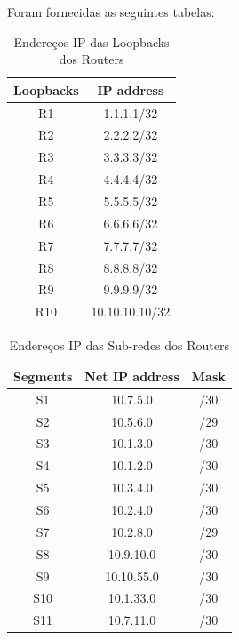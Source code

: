 \documentclass[11pt,english, openright, oneside]{book}
\begin{document}
\vspace{0.2cm}

Foram fornecidas as seguintes tabelas:

\begin{table}[H]
\centering
\begin{tabular}{|c|c|}
\hline
\textbf{Loopbacks} & \textbf{IP address} \\ \hline
R1 & 1.1.1.1/32 \\ \hline
R2 & 2.2.2.2/32 \\ \hline
R3 & 3.3.3.3/32 \\ \hline
R4 & 4.4.4.4/32 \\ \hline
R5 & 5.5.5.5/32 \\ \hline
R6 & 6.6.6.6/32 \\ \hline
R7 & 7.7.7.7/32 \\ \hline
R8 & 8.8.8.8/32 \\ \hline
R9 & 9.9.9.9/32 \\ \hline
R10 & 10.10.10.10/32 \\ \hline
\end{tabular}
\caption{Endereços IP das Loopbacks dos Routers}
\label{tab:loopbacks}
\end{table}
\vspace{0.2cm}

\begin{table}[H]
\centering
\begin{tabular}{|c|c|c|}
\hline
\textbf{Segments} & \textbf{Net IP address} & \textbf{Mask} \\ \hline
S1 & 10.7.5.0 & /30 \\ \hline
S2 & 10.5.6.0 & /29 \\ \hline
S3 & 10.1.3.0 & /30 \\ \hline
S4 & 10.1.2.0 & /30 \\ \hline
S5 & 10.3.4.0 & /30 \\ \hline
S6 & 10.2.4.0 & /30 \\ \hline
S7 & 10.2.8.0 & /29 \\ \hline
S8 & 10.9.10.0 & /30 \\ \hline
S9 & 10.10.55.0 & /30 \\ \hline
S10 & 10.1.33.0 & /30 \\ \hline
S11 & 10.7.11.0 & /30 \\ \hline
\end{tabular}
\caption{Endereços IP das Sub-redes dos Routers}
\label{tab:subredes}
\end{table}
\vspace{0.2cm}
\end{document}
